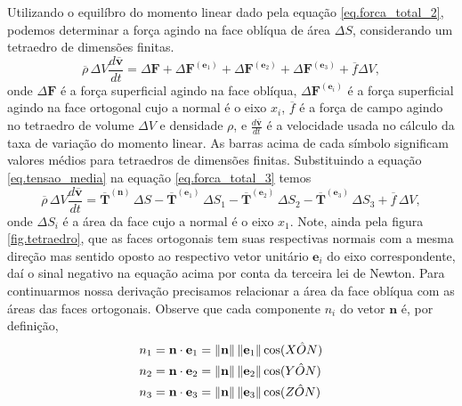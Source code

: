  Utilizando o equil\'ibro do momento linear dado pela equa\c{c}\~ao \ref{eq.forca_total_2}, podemos determinar a for\c{c}a agindo na face obl\'iqua de \'area $\Delta S$, considerando um tetraedro de dimens\~oes finitas.
\begin{equation}\label{eq.forca_total_3}
\overline{\rho}\,\Delta V\frac{d\overline{\mathbf{v}}}{dt}=\Delta \mathbf{F}+\Delta\mathbf{F}^{(\mathbf{e}_1)}+\Delta\mathbf{F}^{(\mathbf{e}_2)}+\Delta\mathbf{F}^{(\mathbf{e}_3)}+\overline{f}\Delta V,
\end{equation} 
onde $\Delta\mathbf{F}$ \'e a for\c{c}a superficial agindo na face obl\'iqua, $\Delta\mathbf{F}^{(\mathbf{e}_i)}$ \'e a for\c{c}a superficial agindo na face ortogonal cujo a normal \'e o eixo $x_i$, $\overline{f}$ \'e a for\c{c}a de campo agindo no tetraedro de volume $\Delta V$ e densidade $\rho$, e $\frac{d\overline{\mathbf{v}}}{dt}$ \'e a velocidade usada no c\'alculo da taxa de varia\c{c}\~ao do momento linear. As barras acima de cada s\'imbolo significam valores m\'edios para tetraedros de dimens\~oes finitas. Substituindo a equa\c{c}\~ao \ref{eq.tensao_media} na equa\c{c}\~ao \ref{eq.forca_total_3} temos
\begin{equation}\label{eq.forca_total_4}
\overline{\rho}\,\Delta V\frac{d\overline{\mathbf{v}}}{dt}=\mathbf{\overline{T}}^{(\mathbf{n})}\,\Delta S-\mathbf{\overline{T}}^{(\mathbf{e}_1)}\,\Delta S_1-\mathbf{\overline{T}}^{(\mathbf{e}_2)}\,\Delta S_2-\mathbf{\overline{T}}^{(\mathbf{e}_3)}\,\Delta S_3+\overline{f}\,\Delta V,
\end{equation}
onde $\Delta S_i$ \'e a \'area da face cujo a normal \'e o eixo $x_1$. Note, ainda pela figura \ref{fig.tetraedro}, que as faces ortogonais tem suas respectivas normais com a mesma dire\c{c}\~ao mas sentido oposto ao respectivo vetor unit\'ario $\mathbf{e}_i$ do eixo correspondente, da\'i o sinal negativo na equa\c{c}\~ao acima por conta da terceira lei de Newton. Para continuarmos nossa deriva\c{c}\~ao precisamos relacionar a \'area da face obl\'iqua com as \'areas das faces ortogonais. Observe que cada componente $n_i$ do vetor $\mathbf{n}$ \'e, por defini\c{c}\~ao,
\begin{align*}
n_1&=\mathbf{n}\cdot\mathbf{e}_1=\lVert\mathbf{n}\rVert\,\lVert\mathbf{e}_1\rVert\cos(X\hat{O}N)\\
n_2&=\mathbf{n}\cdot\mathbf{e}_2=\lVert\mathbf{n}\rVert\,\lVert\mathbf{e}_2\rVert\cos(Y\hat{O}N)\\
n_3&=\mathbf{n}\cdot\mathbf{e}_3=\lVert\mathbf{n}\rVert\,\lVert\mathbf{e}_3\rVert\cos(Z\hat{O}N)\\
\end{align*}
